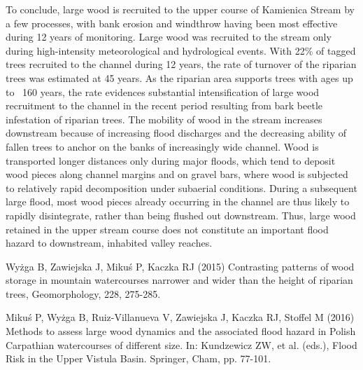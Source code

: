 {To conclude, large wood is recruited to the upper course of Kamienica Stream by a few processes, with bank erosion and windthrow having been most effective during 12 years of monitoring. Large wood was recruited to the stream only during high-intensity meteorological and hydrological events. With 22\% of tagged trees recruited to the channel during 12 years, the rate of turnover of the riparian trees was estimated at 45 years. As the riparian area supports trees with ages up to ~160 years, the rate evidences substantial intensification of large wood recruitment to the channel in the recent period resulting from bark beetle infestation of riparian trees. The mobility of wood in the stream increases downstream because of increasing flood discharges and the decreasing ability of fallen trees to anchor on the banks of increasingly wide channel. Wood is transported longer distances only during major floods, which tend to deposit wood pieces along channel margins and on gravel bars, where wood is subjected to relatively rapid decomposition under subaerial conditions. During a subsequent large flood, most wood pieces already occurring in the channel are thus likely to rapidly disintegrate, rather than being flushed out downstream. Thus, large wood retained in the upper stream course does not constitute an important flood hazard to downstream, inhabited valley reaches.
}%

{Wyżga B, Zawiejska J, Mikuś P, Kaczka RJ (2015) Contrasting patterns of wood storage in mountain watercourses narrower and wider than the height of riparian trees, Geomorphology, 228, 275-285.  

Mikuś P, Wyżga B, Ruiz-Villanueva V, Zawiejska J, Kaczka RJ, Stoffel M (2016) Methods to assess large wood dynamics and the associated flood hazard in Polish Carpathian watercourses of different size. In: Kundzewicz ZW, et al. (eds.), Flood Risk in the Upper Vistula Basin. Springer, Cham, pp. 77-101.
}%

